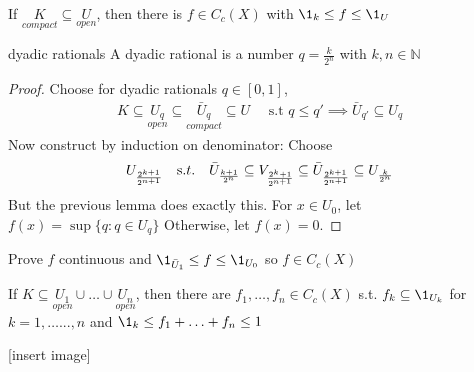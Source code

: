 \begin{lemma}
	If $\underset{compact}{K} \subseteq \underset{open}{U}$, then there is  $f \in C_{c} (X)$ with $\1_k \leq f \leq \1_U$
\end{lemma}

\begin{remark} dyadic rationals
		A dyadic rational is a number $q = \frac{k}{2^{n}}$ with $k,n \in \mathbb{N}$
\end{remark}

\begin{proof}
	Choose for dyadic rationals $q \in [0,1]$,
	\begin{align*}
		K \subseteq  {\underset {open} {U_{q}}} \subseteq {\underset {compact} {\bar{U}_{q}}} \subseteq U \quad \text{ s.t }
		q \leq q' \implies \bar{U}_{q'} \subseteq U_{q}
	\end{align*}
	Now construct by induction on denominator: Choose
	\begin{align*}
		U_{\frac{2^{k+1}}{2^{n+1}}} \quad {\text s.t. }\quad
		\bar{U}_{\frac{k+1}{2^{n}}} \subseteq V_{\frac{2^{k} + 1}{2^{n+1}}} \subseteq \bar{U}_{\frac{2^{k+1}}{2^{n+1}}} \subseteq U_{\frac{k}{2^{n}}}
	\end{align*}
	But the previous lemma does exactly this. For $x \in U_{0}$, let $f(x) = \sup\{q : q \in U_{q}\}$
	Otherwise, let $f(x) = 0$.
\end{proof}

\begin{exercise}
	Prove $f$ continuous and $\1_{\bar{U}_1} \leq f \leq \1_{U_{0}}$ so $f \in C_c(X)$
\end{exercise}


\begin{lemma}
	If $K \subseteq \underset{open}{U_{1}} \cup \ldots \cup \underset{open}{U_n}$, then there are
	$f_1, \ldots, f_n \in C_c(X)$ s.t. $f_k \subseteq \1_{U_{k}}$ for $k = 1, \ldots ..., n$ and
	$\1_k \leq f_1 + \ldots+ f_n \leq 1$
\end{lemma}

[insert image]

